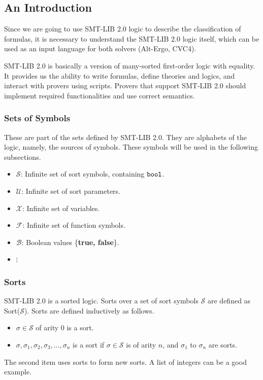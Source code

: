 \documentclass[10pt,letter]{article}
\theoremstyle{definition}
\begin{document}
\subsection{An Introduction}

Since we are going to use SMT-LIB 2.0 logic to describe the classification of formulas, it is necessary to understand the SMT-LIB 2.0 logic itself, which can be used as an input language for both solvers (Alt-Ergo, CVC4).

SMT-LIB 2.0 is basically a version of many-sorted first-order logic with equality\cite{bs2010}. It provides us the ability to write formulas, define theories and logics, and interact with provers using scripts. Provers that support SMT-LIB 2.0 should implement required functionalities and use correct semantics.

\subsubsection{Sets of Symbols}

These are part of the sets defined by SMT-LIB 2.0\cite{barrett:smt-lib:2010}. They are alphabets of the logic, namely, the sources of symbols. These symbols will be used in the following subsections.
\begin{itemize}
\item $\mathcal{S}$: Infinite set of sort symbols, containing $\tt bool$.
\item $\mathcal{U}$: Infinite set of sort parameters.
\item $\mathcal{X}$: Infinite set of variables.
\item $\mathcal{F}$: Infinite set of function symbols.
\item $\mathcal{B}$: Boolean values \{{\bf true, false}\}.
\item \qquad$\vdots$
\end{itemize}



\subsubsection{Sorts}

SMT-LIB 2.0 is a sorted logic. Sorts over a set of sort symbols $\mathcal{S}$ are defined as Sort($\mathcal{S}$). Sorts are defined inductively as follows.

\begin{itemize}
\item $\sigma \in \mathcal{S}$ of arity 0 is a sort.
\item $\sigma,\sigma_1, \sigma_2, \sigma_3, \ldots, \sigma_n$ is a sort if $\sigma \in \mathcal{S}$ is of arity $n$, and $\sigma_1$ to $\sigma_n$ are sorts.
\end{itemize}
The second item uses sorts to form new sorts. A list of integers can be a good example.
\end{document}
